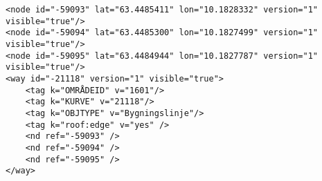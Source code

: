\begin{lstlisting}
<node id="-59093" lat="63.4485411" lon="10.1828332" version="1" visible="true"/>
<node id="-59094" lat="63.4485300" lon="10.1827499" version="1" visible="true"/>
<node id="-59095" lat="63.4484944" lon="10.1827787" version="1" visible="true"/>
<way id="-21118" version="1" visible="true">
	<tag k="OMRÅDEID" v="1601"/>
	<tag k="KURVE" v="21118"/>
	<tag k="OBJTYPE" v="Bygningslinje"/>
	<tag k="roof:edge" v="yes" />
	<nd ref="-59093" />
	<nd ref="-59094" />
	<nd ref="-59095" />
</way>  
\end{lstlisting}